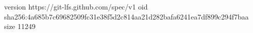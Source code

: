 version https://git-lfs.github.com/spec/v1
oid sha256:4a685b7c69682509fc31e38f5d2c814aa21d282bafa6241ea7df899c294f7baa
size 11249
